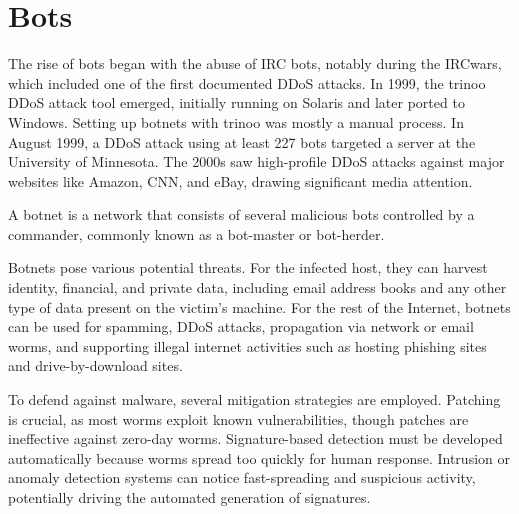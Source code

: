 \section{Bots}

The rise of bots began with the abuse of IRC bots, notably during the IRCwars, which included one of the first documented DDoS attacks. 
In 1999, the trinoo DDoS attack tool emerged, initially running on Solaris and later ported to Windows.
 Setting up botnets with trinoo was mostly a manual process. 
In August 1999, a DDoS attack using at least 227 bots targeted a server at the University of Minnesota. 
The 2000s saw high-profile DDoS attacks against major websites like Amazon, CNN, and eBay, drawing significant media attention.

\begin{definition}
    A botnet is a network that consists of several malicious bots controlled by a commander, commonly known as a bot-master or bot-herder.
\end{definition}

Botnets pose various potential threats. 
For the infected host, they can harvest identity, financial, and private data, including email address books and any other type of data present on the victim's machine. 
For the rest of the Internet, botnets can be used for spamming, DDoS attacks, propagation via network or email worms, and supporting illegal internet activities such as hosting phishing sites and drive-by-download sites.

To defend against malware, several mitigation strategies are employed. 
Patching is crucial, as most worms exploit known vulnerabilities, though patches are ineffective against zero-day worms. 
Signature-based detection must be developed automatically because worms spread too quickly for human response.
Intrusion or anomaly detection systems can notice fast-spreading and suspicious activity, potentially driving the automated generation of signatures.